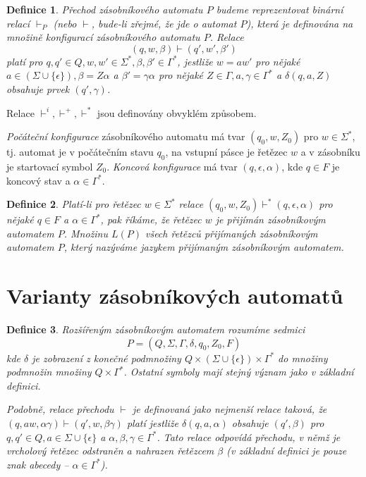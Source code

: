 \documentclass[a4paper, 11pt]{report}
\newtheorem{mydef}{Definice}[chapter]
\begin{document}
\begin{mydef}
\emph{Přechod} zásobníkového automatu $P$ budeme reprezentovat binární relací $\vdash_P$ (nebo $\vdash$, bude-li zřejmé, že jde o automat $P$), která je definována na množině konfigurací zásobníkového automatu $P$. Relace
$$(q, w, \beta) \vdash (q', w', \beta')$$
platí pro $q, q' \in Q, w, w' \in \Sigma^*, \beta, \beta' \in \Gamma^*$, jestliže $w = aw'$ pro nějaké $a \in (\Sigma \cup \{\epsilon\}), \beta = Z \alpha$ a $\beta' = \gamma \alpha$ pro nějaké $Z \in \Gamma, a, \gamma \in \Gamma^*$ a $\delta(q, a, Z)$ obsahuje prvek $(q', \gamma)$.
\end{mydef}

Relace $\vdash^i, \vdash^+, \vdash^*$ jsou definovány obvyklém způsobem.

\emph{Počáteční konfigurace} zásobníkového automatu má tvar $(q_0, w, Z_0)$ pro $w \in \Sigma^*$, tj. automat je v počátečním stavu $q_0$, na vstupní pásce je řetězec $w$ a v zásobníku je startovací symbol $Z_0$. \emph{Koncová konfigurace} má tvar $(q, \epsilon, \alpha)$, kde $q \in F$ je koncový stav a $\alpha \in \Gamma^*$.

\begin{mydef}
Platí-li pro řetězec $w \in \Sigma^*$ relace $(q_0, w, Z_0) \vdash^* (q, \epsilon, \alpha)$ pro nějaké $q \in F$ a $\alpha \in \Gamma^*$, pak říkáme, že řetězec $w$ je přijímán zásobníkovým automatem $P$. Množinu $L(P)$ všech řetězců přijímaných zásobníkovým automatem $P$, který nazýváme
\emph{jazykem přijímaným zásobníkovým automatem}.
\end{mydef}

\section{Varianty zásobníkových automatů}

\begin{mydef}
\emph{Rozšířeným zásobníkovým automatem} rozumíme sedmici
$$P = (Q, \Sigma, \Gamma, \delta, q_0, Z_0, F)$$
kde $\delta$ je zobrazení z konečné podmnožiny $Q \times (\Sigma \cup \{\epsilon\}) \times \Gamma^*$ do množiny podmnožin množiny $Q \times \Gamma^*$. Ostatní symboly mají stejný význam jako v základní definici.

Podobně, relace přechodu $\vdash$ je definovaná jako \emph{nejmenší} relace taková, že $(q, aw, \alpha \gamma) \vdash (q', w, \beta \gamma)$ platí jestliže $\delta(q, a, \alpha)$ obsahuje $(q', \beta)$ pro $q, q' \in Q, a \in \Sigma \cup \{\epsilon\}$ a $\alpha, \beta, \gamma \in \Gamma^*$. Tato relace odpovídá přechodu, v němž je vrcholový řetězec odstraněn a nahrazen řetězcem $\beta$ (v základní definici je pouze znak abecedy -- $\alpha \in \Gamma^*$).
\end{mydef}
\end{document}

